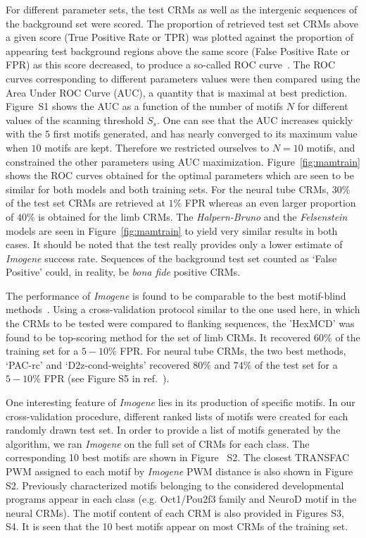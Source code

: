 \documentclass[a4,center,fleqn]{NAR}
\begin{document}
For different parameter sets, the test CRMs  as well as the  intergenic
sequences of the background set  were scored.
The proportion of retrieved test set CRMs above a given score (True Positive
Rate or TPR) was plotted against the proportion of appearing test background
regions above the same score (False Positive Rate or FPR) as this score
decreased, to produce a  so-called ROC curve~\cite{hastie}. 
The ROC curves corresponding to different parameters values were then compared
using the Area Under ROC Curve (AUC), a quantity that is maximal at best
prediction.
Figure~S1
shows the AUC as a function of the number of motifs $N$ for
different values of the  scanning threshold $S_s$.
One can see that the AUC increases quickly with the $5$ first motifs generated,
and has nearly converged to its maximum value when $10$ motifs are kept.
Therefore we  restricted ourselves to  $N=10$ motifs, and constrained the other
parameters using AUC maximization.
Figure~\ref{fig:mamtrain} shows the ROC curves obtained for the optimal
parameters which are seen to be similar for both models and both training sets.
For the neural tube CRMs,  $30\%$ of the test set CRMs are retrieved at $1\%$ FPR
whereas an even larger proportion of $40\%$ is obtained for the limb
CRMs.
The {\em Halpern-Bruno} and  the {\em Felsenstein} models are seen in
Figure~\ref{fig:mamtrain} to yield very similar results in both cases.
It should be noted that the test really provides only a lower estimate of {\em
Imogene} success rate.
Sequences of the background test set counted as `False Positive' could, in
reality, be {\em bona fide} positive CRMs.

The performance of {\em Imogene} is found to be comparable to the best
motif-blind methods~\cite{kantorovitz2009motif}.
Using a cross-validation protocol similar to the one used here, in which the
CRMs to be tested were compared to flanking sequences, the 'HexMCD' was found
to be top-scoring method for the set of limb CRMs.
It recovered $60 \%$ of the training set for a $5-10\%$ FPR.
For neural tube CRMs, the two best methods, `PAC-rc' and `D2z-cond-weights'
recovered  $80\%$ and $74\%$ of the test set for a $5-10\%$ FPR (see Figure S5
in ref.~\cite{kantorovitz2009motif}).

One interesting feature of {\em Imogene} lies in its production of specific
motifs.
In our cross-validation procedure, different ranked lists of motifs were
created for each randomly drawn test set. 
In order to provide a list of motifs generated by the algorithm, we ran {\em
Imogene} on the full set of CRMs for each class.
The corresponding 10 best motifs are shown in Figure~
S2.  
The closest TRANSFAC PWM  assigned to each motif by {\em Imogene} PWM distance
is also shown in Figure~
S2.
Previously characterized motifs belonging to the considered developmental
programs appear in each class (e.g. Oct1/Pou2f3 family and NeuroD motif in the neural CRMs).
The motif content of each CRM is also provided in Figures
S3, S4.
It is seen that the 10 best motifs appear on most CRMs of the training set.
\end{document}
